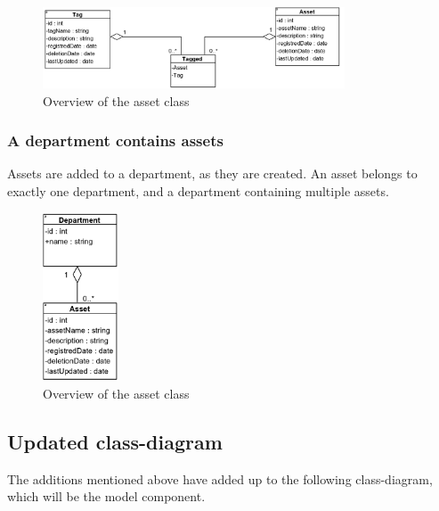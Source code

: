 \begin{figure}[H]
    \centering
    \includegraphics[width=0.8\textwidth]{figures/TagAssetRelation.PNG}
    \caption{Overview of the asset class}
    \label{fig:TagAssetRelation}
\end{figure}

\subsubsection{A department contains assets}
Assets are added to a department, as they are created. An asset belongs to exactly one department, and a department containing multiple assets.

\begin{figure}[H]
    \centering
    \includegraphics[width=0.2\textwidth]{figures/AssetDepartmentRelation.PNG}
    \caption{Overview of the asset class}
    \label{fig:AssetDepartmentRelation}
\end{figure}

\subsection{Updated class-diagram}
The additions mentioned above have added up to the following class-diagram, which will be the model component.

